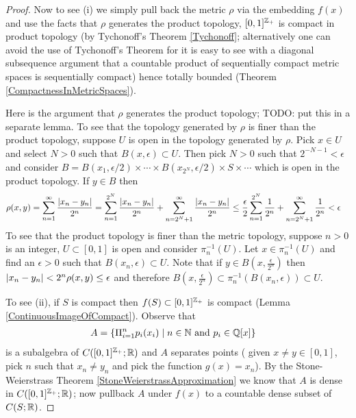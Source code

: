 \begin{proof}
Now to see (i) we simply pull back the metric $\rho$ via the embedding
$f(x)$ and use the facts that $\rho$ generates the product topology,
$[0,1]^{\mathbb{Z}_+}$ is compact in product topology
(by Tychonoff's Theorem \ref{Tychonoff}; alternatively one can avoid
the use of Tychonoff's Theorem for it is easy to
see with a diagonal subsequence argument that a countable product of
sequentially compact metric spaces is sequentially compact) hence totally bounded (Theorem
\ref{CompactnessInMetricSpaces}).

Here is the argument that $\rho$ generates the product topology; TODO:
put this in a separate lemma.  To see that the topology generated by
$\rho$ is finer than the product topology, suppose $U$ is open in the
topology generated by $\rho$.  Pick $x \in U$ and select $N > 0$ such
that $B(x,\epsilon) \subset U$.  Then pick $N > 0$ such that $2^{-N-1} <
\epsilon$ and consider $B=B(x_1, \epsilon/2)
\times \dotsb \times B(x_{2^N}, \epsilon/2) \times S \times \dotsb$
which is open in the product topology.  If $y \in B$ then 
\begin{align*}
\rho(x,y) &=
\sum_{n=1}^\infty \frac{\left \vert x_n-y_n \right \vert}{2^n} = \sum_{n=1}^{2^N}
\frac{\left \vert x_n-y_n \right \vert}{2^n} + \sum_{n=2^N+1}^\infty \frac{\left \vert x_n-y_n \right \vert}{2^n} \leq
\frac{\epsilon}{2} \sum_{n=1}^{2^N} \frac{1}{2^n} +
\sum_{n=2^N+1}^\infty \frac{1}{2^n} < \epsilon
\end{align*}
To see that the product topology is finer than the metric topology,
suppose $n >0$ is an integer, $U\subset[0,1]$ is open and consider $\pi_n^{-1}(U)$.  Let $x
\in \pi_n^{-1}(U)$ and find an $\epsilon > 0$ such that $B(x_n,
\epsilon) \subset U$.  Note that if $y \in B(x, \frac{\epsilon}{2^n})$
then $\left \vert x_n - y_n \right \vert < 2^n \rho(x,y) \leq \epsilon$ and therefore
$B(x, \frac{\epsilon}{2^n}) \subset \pi_n^{-1}(B(x_n, \epsilon))
\subset U$.

To see (ii), if $S$ is compact then $f(S) \subset [0,1]^{\mathbb{Z}_+}$
is compact (Lemma \ref{ContinuousImageOfCompact}).  Observe that 
\begin{align*}
A &= \lbrace \Pi_{i=1}^np_i(x_i) \mid n \in \mathbb{N} \text{ and } p_i
\in \mathbb{Q}[x] \rbrace
\end{align*}
is a subalgebra of $C([0,1]^{\mathbb{Z}_+} ; \mathbb{R})$ and $A$ separates points (
given $x \neq y \in [0,1]$, pick
$n$ such that $x_n \neq y_n$ and pick the function $g(x) = x_n$).  By
the Stone-Weierstrass Theorem \ref{StoneWeierstrassApproximation} we know that $A$ is dense in $C([0,1]^{\mathbb{Z}_+};
\mathbb{R})$; now pullback $A$ under $f(x)$ to a countable dense subset of
$C(S;\mathbb{R})$. 


\end{proof}
